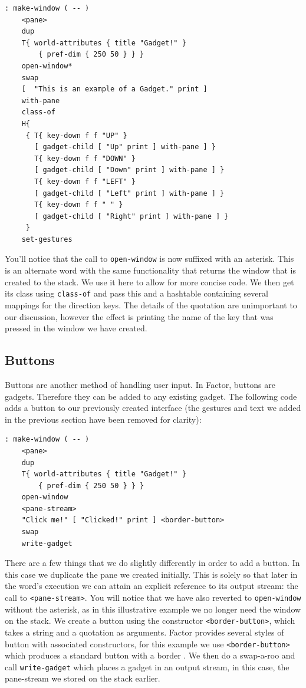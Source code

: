 \documentclass{sig-alternate}
\begin{document}
\begin{verbatim}
: make-window ( -- )
    <pane>
    dup
    T{ world-attributes { title "Gadget!" }
        { pref-dim { 250 50 } } }
    open-window*
    swap
    [  "This is an example of a Gadget." print ]
    with-pane
    class-of
    H{
     { T{ key-down f f "UP" } 
       [ gadget-child [ "Up" print ] with-pane ] }
       T{ key-down f f "DOWN" } 
       [ gadget-child [ "Down" print ] with-pane ] }
       T{ key-down f f "LEFT" } 
       [ gadget-child [ "Left" print ] with-pane ] }
       T{ key-down f f " " } 
       [ gadget-child [ "Right" print ] with-pane ] }
	 }
    set-gestures
    \end{verbatim}
    
You'll notice that the call to \texttt{open-window} is now suffixed with an asterisk. This is an alternate word with the same functionality that returns the window that is created to the stack. We use it here to allow for more concise code. We then get its class using \texttt{class-of} and pass this and a hashtable containing several mappings for the direction keys. The details of the quotation are unimportant to our discussion, however the effect is printing the name of the key that was pressed in the window we have created.

\subsection{Buttons}

Buttons are another method of handling user input. In Factor, buttons are gadgets. Therefore they can be added to any existing gadget. The following code adds a button to our previously created interface (the gestures and text we added in the previous section have been removed for clarity):

\begin{verbatim}
: make-window ( -- )
    <pane>
    dup
    T{ world-attributes { title "Gadget!" }
        { pref-dim { 250 50 } } }
    open-window
    <pane-stream>
    "Click me!" [ "Clicked!" print ] <border-button>
    swap
    write-gadget
    \end{verbatim}

There are a few things that we do slightly differently in order to add a button. In this case we duplicate the pane we created initially. This is solely so that later in the word's execution we can attain an explicit reference to its output stream: the call to \texttt{<pane-stream>}. You will notice that we have also reverted to \texttt{open-window} without the asterisk, as in this illustrative example we no longer need the window on the stack. We create a button using the constructor \texttt{<border-button>}, which takes a string and a quotation as arguments. Factor provides several styles of button with associated constructors, for this example we use \texttt{<border-button>} which produces a standard button with a border \cite{button}. We then do a swap-a-roo and call \texttt{write-gadget} which places a gadget in an output stream, in this case, the pane-stream we stored on the stack earlier.
\end{document}
